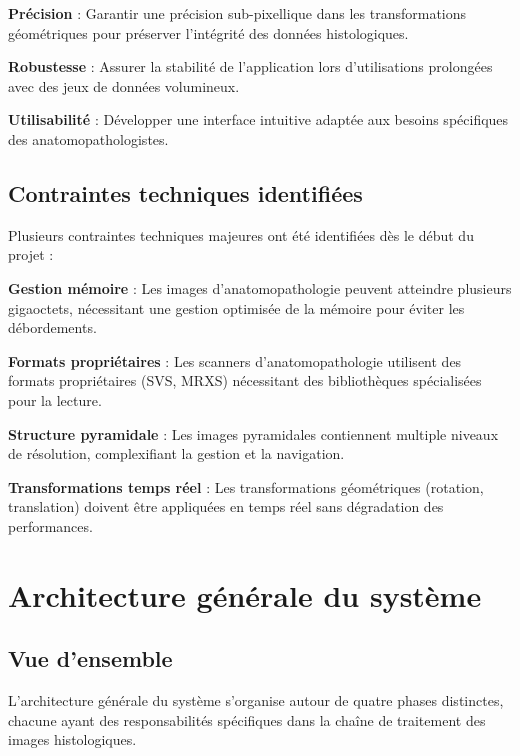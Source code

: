 \documentclass[12pt,a4paper]{report}
\begin{document}
\textbf{Précision} : Garantir une précision sub-pixellique dans les transformations géométriques pour préserver l'intégrité des données histologiques.

\textbf{Robustesse} : Assurer la stabilité de l'application lors d'utilisations prolongées avec des jeux de données volumineux.

\textbf{Utilisabilité} : Développer une interface intuitive adaptée aux besoins spécifiques des anatomopathologistes.

\subsection{Contraintes techniques identifiées}

Plusieurs contraintes techniques majeures ont été identifiées dès le début du projet :

\textbf{Gestion mémoire} : Les images d'anatomopathologie peuvent atteindre plusieurs gigaoctets, nécessitant une gestion optimisée de la mémoire pour éviter les débordements.

\textbf{Formats propriétaires} : Les scanners d'anatomopathologie utilisent des formats propriétaires (SVS, MRXS) nécessitant des bibliothèques spécialisées pour la lecture.

\textbf{Structure pyramidale} : Les images pyramidales contiennent multiple niveaux de résolution, complexifiant la gestion et la navigation.

\textbf{Transformations temps réel} : Les transformations géométriques (rotation, translation) doivent être appliquées en temps réel sans dégradation des performances.

\section{Architecture générale du système}

\subsection{Vue d'ensemble}

L'architecture générale du système s'organise autour de quatre phases distinctes, chacune ayant des responsabilités spécifiques dans la chaîne de traitement des images histologiques.
\end{document}
